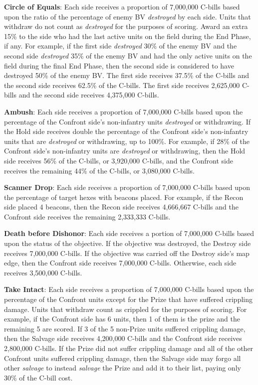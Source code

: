 \begin{description}

\item {\bfseries Circle of Equals}: Each side receives a proportion of 7,000,000 C-bills based upon the ratio of the percentage of enemy BV \emph{destroyed} by each side.
Units that withdraw do not count as \emph{destroyed} for the purposes of scoring.
Award an extra 15\% to the side who had the last active units on the field during the End Phase, if any.
For example, if the first side \emph{destroyed} 30\% of the enemy BV and the second side \emph{destroyed} 35\% of the enemy BV and had the only active units on the field during the final End Phase, then the second side is considered to have destroyed 50\% of the enemy BV.
The first side receives 37.5\% of the C-bills and the second side receives 62.5\% of the C-bills.
The first side receives 2,625,000 C-bills and the second side receives 4,375,000 C-bills.

\item {\bfseries Ambush}: Each side receives a proportion of 7,000,000 C-bills based upon the percentage of the Confront side's non-infantry units \emph{destroyed} or withdrawing.
If the Hold side receives double the percentage of the Confront side's non-infantry units that are \emph{destroyed} or withdrawing, up to 100\%.
For example, if 28\% of the Confront side's non-infantry units are \emph{destroyed} or withdrawing, then the Hold side receives 56\% of the C-bills, or 3,920,000 C-bills, and the Confront side receives the remaining 44\% of the C-bills, or 3,080,000 C-bills.

\item {\bfseries Scanner Drop}: Each side receives a proportion of 7,000,000 C-bills based upon the percentage of target hexes with beacons placed.
For example, if the Recon side placed 4 beacons, then the Recon side receives 4,666,667 C-bills and the Confront side receives the remaining 2,333,333 C-bills.

\item {\bfseries Death before Dishonor}: Each side receives a portion of 7,000,000 C-bills based upon the status of the objective.
If the objective was destroyed, the Destroy side receives 7,000,000 C-bills.
If the objective was carried off the Destroy side's map edge, then the Confront side receives 7,000,000 C-bills.
Otherwise, each side receives 3,500,000 C-bills.

\item {\bfseries Take Intact}: Each side receives a proportion of 7,000,000 C-bills based upon the percentage of the Confront units except for the Prize that have suffered crippling damage.
Units that withdraw count as crippled for the purposes of scoring.
For example, if the Confront side has 6 units, then 1 of them is the prize and the remaining 5 are scored.
If 3 of the 5 non-Prize units suffered crippling damage, then the Salvage side receives 4,200,000 C-bills and the Confront side receives 2,800,000 C-bills.
If the Prize did not suffer crippling damage and all of the other Confront units suffered crippling damage, then the Salvage side may forgo all other \emph{salvage} to instead \emph{salvage} the Prize and add it to their list, paying only 30\% of the C-bill cost.


\end{description}
